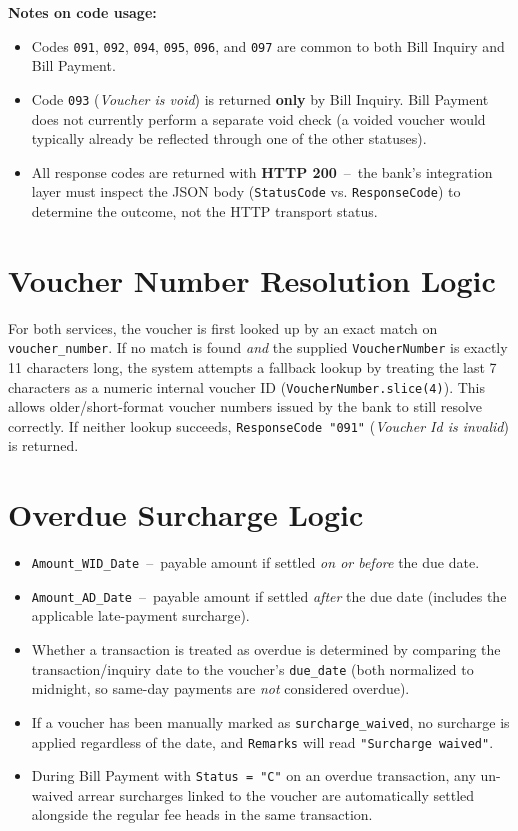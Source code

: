 \documentclass[11pt]{article}
\begin{document}
\noindent\textbf{Notes on code usage:}
\begin{itemize}
    \item Codes \texttt{091}, \texttt{092}, \texttt{094}, \texttt{095}, \texttt{096}, and \texttt{097} are common to both Bill Inquiry and Bill Payment.
    \item Code \texttt{093} (\textit{Voucher is void}) is returned \textbf{only} by Bill Inquiry. Bill Payment does not currently perform a separate void check (a voided voucher would typically already be reflected through one of the other statuses).
    \item All response codes are returned with \textbf{HTTP 200} \,--\, the bank's integration layer must inspect the JSON body (\texttt{StatusCode} vs. \texttt{ResponseCode}) to determine the outcome, not the HTTP transport status.
\end{itemize}

\section{Voucher Number Resolution Logic}
For both services, the voucher is first looked up by an exact match on \texttt{voucher\_number}.
If no match is found \emph{and} the supplied \texttt{VoucherNumber} is exactly 11 characters
long, the system attempts a fallback lookup by treating the last 7 characters as a numeric
internal voucher ID (\texttt{VoucherNumber.slice(4)}). This allows older/short-format voucher
numbers issued by the bank to still resolve correctly. If neither lookup succeeds,
\texttt{ResponseCode "091"} (\textit{Voucher Id is invalid}) is returned.

\section{Overdue Surcharge Logic}
\begin{itemize}
    \item \texttt{Amount\_WID\_Date} \,--\, payable amount if settled \emph{on or before} the due date.
    \item \texttt{Amount\_AD\_Date} \,--\, payable amount if settled \emph{after} the due date (includes the applicable late-payment surcharge).
    \item Whether a transaction is treated as overdue is determined by comparing the
    transaction/inquiry date to the voucher's \texttt{due\_date} (both normalized to midnight,
    so same-day payments are \emph{not} considered overdue).
    \item If a voucher has been manually marked as \texttt{surcharge\_waived}, no surcharge is
    applied regardless of the date, and \texttt{Remarks} will read \texttt{"Surcharge waived"}.
    \item During Bill Payment with \texttt{Status = "C"} on an overdue transaction, any
    un-waived arrear surcharges linked to the voucher are automatically settled alongside the
    regular fee heads in the same transaction.
\end{itemize}
\end{document}
